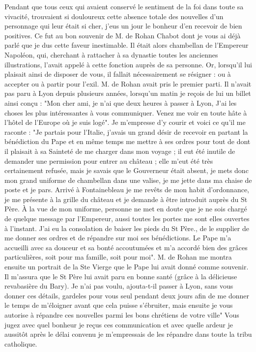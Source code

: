 \documentclass[11pt,a4paper]{report}
\begin{document}
Pendant que tous ceux qui avaient conservé le sentiment de la foi dans toute sa vivacité, trouvaient si douloureux cette absence totale des nouvelles d'un personnage qui leur était si cher, j'eus un jour le bonheur d'en recevoir de bien positives. Ce fut au bon souvenir de M. de Rohan Chabot dont je vous ai déjà parlé que je dus cette faveur inestimable. Il était alors chambellan de l'Empereur Napoléon, qui, cherchant à rattacher à sa dynastie toutes les anciennes illustrations, l'avait appelé à cette fonction auprès de sa personne. Or, lorsqu'il lui plaisait ainsi de disposer de vous, il fallait nécessairement se résigner : ou à accepter ou à partir pour l'exil. M. de Rohan avait pris le premier parti. Il n'avait pas paru à Lyon depuis plusieurs années, lorsqu'un matin je reçois de lui un billet ainsi conçu : "Mon cher ami, je n'ai que deux heures à passer à Lyon, J'ai les choses les plus intéressantes à vous communiquer. Venez me voir en toute hâte à l'hôtel de l'Europe où je suis logé". Je m'empresse d'y courir et voici ce qu'il me raconte : "Je partais pour l'Italie, j'avais un grand désir de recevoir en partant la bénédiction du Pape et en même temps me mettre à ses ordres pour tout de dont il plaisait à sa Sainteté de me charger dans mon voyage ; il eut été inutile de demander une permission pour entrer au château ; elle m'eut été très certainement refusée, mais je savais que le Gouverneur était absent, je mets donc mon grand uniforme de chambellan dans une valise, je me jette dans ma chaise de poste et je pars. Arrivé à Fontainebleau je me revêts de mon habit d'ordonnance, je me présente à la grille du château et je demande à être introduit auprès du St Père. À la vue de mon uniforme, personne ne met en doute que je ne sois chargé de quelque message par l'Empereur, aussi toutes les portes me sont elles ouvertes à l'instant. J'ai eu la consolation de baiser les pieds du St Père., de le supplier de me donner ses ordres et de répandre sur moi ses bénédictions. Le Pape m'a accueilli avec sa douceur et sa bonté accoutumées et m'a accordé bien des grâces particulières, soit pour ma famille, soit pour moi". M. de Rohan me montra ensuite un portrait de la Ste Vierge que le Pape lui avait donné comme souvenir. Il m'assura que le St Père lui avait paru en bonne santé (grâce à la délicieuse revabasière du Bary). Je n'ai pas voulu, ajouta-t-il passer à Lyon, sans vous donner ces détails, gardeles pour vous seul pendant deux jours afin de me donner le temps de m'éloigner avant que cela puisse s'ébruiter, mais ensuite je vous autorise à répandre ces nouvelles parmi les bons chrétiens de votre ville" Vous jugez avec quel bonheur je reçus ces communication et avec quelle ardeur je aussitôt après le délai convenu je m'empressais de les répandre dans toute la tribu catholique.
\end{document}
